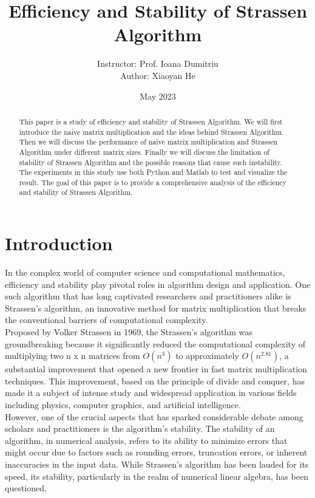 \documentclass{article}
\title{Efficiency and Stability of Strassen Algorithm}
\author{Instructor: Prof. Ioana Dumitriu\\
Author: Xiaoyan He}
\date{May 2023}
\begin{document}
\maketitle

\begin{abstract}
    This paper is a study of efficiency and stability of Strassen Algorithm. We will first introduce the naive matrix multiplication
    and the ideas behind Strassen Algorithm. Then we will discuss the performance of naive matrix multiplication and Strassen Algorithm
    under different matrix sizes. Finally we will discuss the limitation of stability of Strassen Algorithm and the possible reasons that 
    cause such instability. The experiments in this study use both Python and Matlab to test and visualize the result. The goal of this 
    paper is to provide a comprehensive analysis of the efficiency and stability of Strassen Algorithm.

\end{abstract}

\section{Introduction}
\hspace{5.5mm}In the complex world of computer science and computational mathematics, efficiency and stability play pivotal 
roles in algorithm design and application. One such algorithm that has long captivated researchers and practitioners 
alike is Strassen's algorithm, an innovative method for matrix multiplication that breaks the conventional barriers 
of computational complexity.\\

Proposed by Volker Strassen in 1969, the Strassen's algorithm was groundbreaking because it significantly reduced the 
computational complexity of multiplying two n x n matrices from $O(n^3)$ to approximately $O(n^{2.81})$, a substantial improvement 
that opened a new frontier in fast matrix multiplication techniques. This improvement, based on the principle of divide and 
conquer, has made it a subject of intense study and widespread application in various fields including physics, computer 
graphics, and artificial intelligence.\\

However, one of the crucial aspects that has sparked considerable debate among scholars and practitioners is the algorithm's 
stability. The stability of an algorithm, in numerical analysis, refers to its ability to minimize errors that might occur due 
to factors such as rounding errors, truncation errors, or inherent inaccuracies in the input data. While Strassen's algorithm has 
been lauded for its speed, its stability, particularly in the realm of numerical linear algebra, has been questioned.\\
\end{document}
